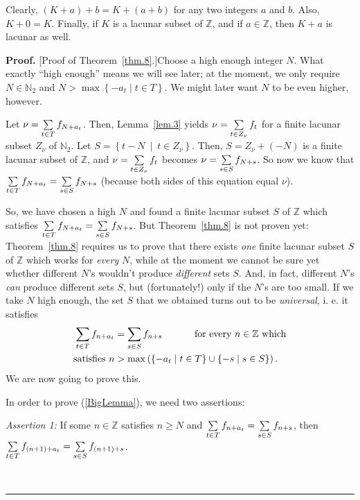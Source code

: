\documentclass[numbers=enddot,12pt,final,onecolumn,notitlepage]{scrartcl}%
\numberwithin{exer}{section}
\theoremstyle{definition}
\newenvironment{proof}[1][Proof]{\noindent\textbf{#1.} }{\ \rule{0.5em}{0.5em}}
\let\sumnonlimits\sum
\renewcommand{\sum}{\sumnonlimits\limits}
\begin{document}
Clearly, $\left(  K+a\right)  +b=K+\left(  a+b\right)  $ for any two integers
$a$ and $b$. Also, $K+0=K$. Finally, if $K$ is a lacunar subset of
$\mathbb{Z}$, and if $a\in\mathbb{Z}$, then $K+a$ is lacunar as well.

\begin{proof}
[Proof of Theorem~\ref{thm.8}.]Choose a high enough integer $N$. What exactly
``high enough'' means we will see later; at the moment, we only require
$N\in\mathbb{N}_{2}$ and $N>\max\left\{  -a_{t}\mid t\in T\right\}  $. We
might later want $N$ to be even higher, however.

Let $\nu=\sum\limits_{t\in T}f_{N+a_{t}}$. Then, Lemma~\ref{lem.3} yields
$\nu=\sum\limits_{t\in Z_{\nu}}f_{t}$ for a finite lacunar subset $Z_{\nu}$ of
$\mathbb{N}_{2}$. Let $S=\left\{  t-N\ \mid\ t\in Z_{\nu}\right\}  $. Then,
$S=Z_{\nu}+\left(  -N\right)  $ is a finite lacunar subset of $\mathbb{Z}$,
and $\nu=\sum\limits_{t\in Z_{\nu}}f_{t}$ becomes $\nu=\sum\limits_{s\in
S}f_{N+s}$. So now we know that $\sum\limits_{t\in T}f_{N+a_{t}}%
=\sum\limits_{s\in S}f_{N+s}$ (because both sides of this equation equal $\nu$).

So, we have chosen a high $N$ and found a finite lacunar subset $S$ of
$\mathbb{Z}$ which satisfies $\sum\limits_{t\in T}f_{N+a_{t}}=\sum
\limits_{s\in S}f_{N+s}$. But Theorem~\ref{thm.8} is not proven yet:
Theorem~\ref{thm.8} requires us to prove that there exists \textit{one} finite
lacunar subset $S$ of $\mathbb{Z}$ which works for \textit{every} $N$, while
at the moment we cannot be sure yet whether different $N$'s wouldn't produce
\textit{different} sets $S$. And, in fact, different $N$'s \textit{can}
produce different sets $S$, but (fortunately!) only if the $N$'s are too
small. If we take $N$ high enough, the set $S$ that we obtained turns out to
be \textit{universal}, i. e. it satisfies
\begin{align}
\sum\limits_{t\in T}f_{n+a_{t}}  &  =\sum\limits_{s\in S}f_{n+s}%
\ \ \ \ \ \ \ \ \ \ \text{for every }n\in\mathbb{Z}\text{ which}\nonumber\\
\text{satisfies }n  &  >\max\left(  \left\{  -a_{t}\mid t\in T\right\}
\cup\left\{  -s\mid s\in S\right\}  \right)  . \label{BigLemma}%
\end{align}
We are now going to prove this.

In order to prove (\ref{BigLemma}), we need two assertions:

\textit{Assertion 1:} If some $n\in\mathbb{Z}$ satisfies $n\geq N$ and
$\sum\limits_{t\in T}f_{n+a_{t}}=\sum\limits_{s\in S}f_{n+s}$, then
$\sum\limits_{t\in T}f_{\left(  n+1\right)  +a_{t}}=\sum\limits_{s\in
S}f_{\left(  n+1\right)  +s}$.


\end{proof}
\end{document}
